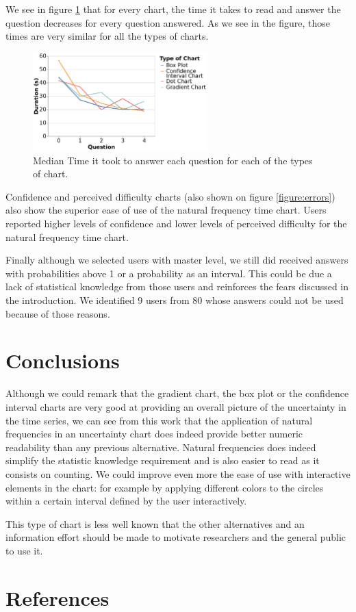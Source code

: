 \documentclass[a4paper,3p,sort&compress]{elsarticle}
\begin{document}
We see in figure \ref{figure:duration} that for every chart, the time it takes 
to read and answer the question decreases for every question answered. As we see in the figure, those times 
are very similar for all the types of charts. 

\begin{figure}
  \centering
   \includegraphics[width=0.6\textwidth]{duration_evo2}
  \caption{\label{figure:duration} Median Time it took to answer each question for each of the types of chart.}
\end{figure}  

Confidence and perceived difficulty charts (also shown on figure \ref{figure:errors}) also show the superior ease of use 
of the natural frequency time chart. Users reported higher levels of confidence and 
lower levels of perceived difficulty for the natural frequency time chart.

Finally although we selected users with master level, we still did received answers with probabilities 
above 1 or a probability as an interval. This could be due a lack of statistical knowledge from those 
users and reinforces the fears discussed in the introduction. 
We identified 9 users from 80 whose answers could not be used because of those reasons.

\section{Conclusions}
\label{sec:concl}

Although we could remark that the gradient chart, the box plot or the confidence interval charts are very good at 
providing an overall picture of the uncertainty in the time series, we can see from this work that the application of natural 
frequencies in an uncertainty chart does indeed
provide better numeric readability than any previous alternative. Natural frequencies does indeed simplify 
the statistic knowledge requirement and is also easier to read as it consists on counting.
We could improve even more the ease of use with interactive elements in the chart: for example
by applying different colors to the circles within a certain interval defined by the user interactively.

This type of chart is less well known that the other alternatives and an information effort should be made to motivate 
researchers and the general public to use it.

\section{References}
\label{sec:ref}



\end{document}

